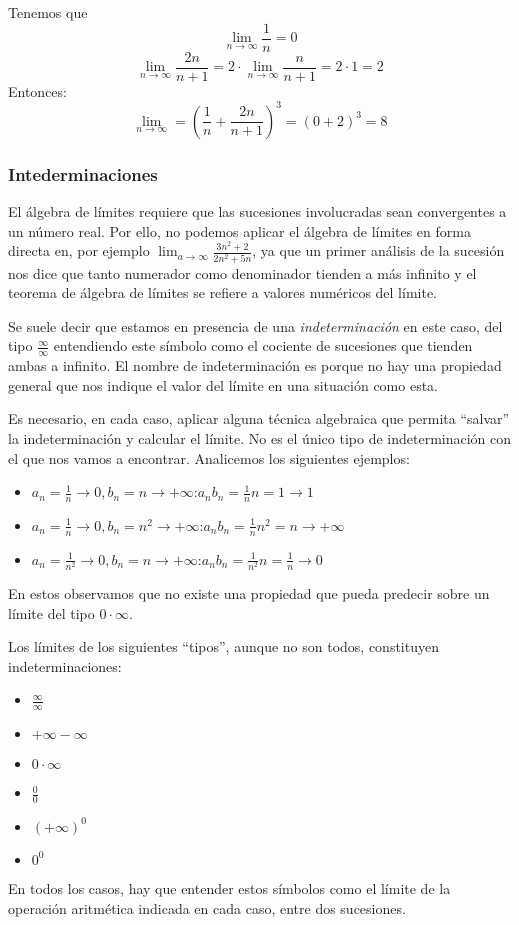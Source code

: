 \documentclass[../teoria.root.tex]{subfiles}
\begin{document}
Tenemos que \[\lim_{n\to\infty}\frac{1}{n}=0\] \[\lim_{n\to\infty}\frac{2n}{n+1}=2\cdot\lim_{n\to\infty}\frac{n}{n+1}=2\cdot1=2\]
Entonces:
\[\lim_{n\to\infty}=\left(\frac{1}{n}+\frac{2n}{n+1}\right)^3=(0+2)^3=8\]
\subsubsection{Intederminaciones}
El álgebra de límites requiere que las sucesiones involucradas sean convergentes a un número real.
Por ello, no podemos aplicar el álgebra de límites en forma directa en, por ejemplo \(\lim_{a\to\infty}\frac{3n^2+2}{2n^2+5n}\), ya que un primer análisis de la sucesión nos dice que tanto numerador como denominador tienden a más infinito y el teorema de álgebra de límites se refiere a valores numéricos del límite.

Se suele decir que estamos en presencia de una \textit{indeterminación} en este caso, del tipo \(\frac{\infty}{\infty}\) entendiendo este símbolo como el cociente de sucesiones que tienden ambas a infinito.
El nombre de indeterminación es porque no hay una propiedad general que nos indique el valor del límite en una situación como esta.

Es necesario, en cada caso, aplicar alguna técnica algebraica que permita “salvar” la indeterminación y calcular el límite.
No es el único tipo de indeterminación con el que nos vamos a encontrar.
Analicemos los siguientes ejemplos:
\begin{itemize}
    \item \(a_n=\frac{1}{n}\rightarrow0,b_n=n\rightarrow+\infty\):\tab\(a_nb_n=\frac{1}{n}n=1\rightarrow1\)
    \item \(a_n=\frac{1}{n}\rightarrow0,b_n=n^2\rightarrow+\infty\):\tab\(a_nb_n=\frac{1}{n}n^2=n\rightarrow+\infty\)
    \item \(a_n=\frac{1}{n^2}\rightarrow0,b_n=n\rightarrow+\infty\):\tab\(a_nb_n=\frac{1}{n^2}n=\frac{1}{n}\rightarrow0\)
\end{itemize}
En estos observamos que no existe una propiedad que pueda predecir sobre un límite del tipo \(0\cdot\infty\).

Los límites de los siguientes “tipos”, aunque no son todos, constituyen indeterminaciones:
\begin{itemize}
    \item \(\frac{\infty}{\infty}\)
    \item \(+\infty-\infty\)
    \item \(0\cdot\infty\)
    \item \(\frac{0}{0}\)
    \item \((+\infty)^0\)
    \item \(0^0\)
\end{itemize}
En todos los casos, hay que entender estos símbolos como el límite de la operación aritmética indicada en cada caso, entre dos sucesiones.
\end{document}
